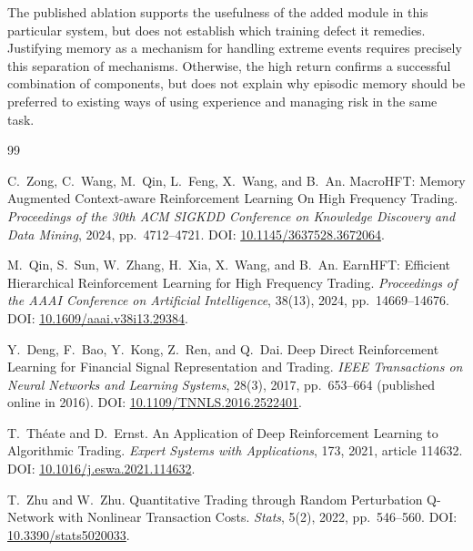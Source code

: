 \documentclass[9pt,a4paper,twocolumn]{extarticle}
\begin{document}
The published ablation supports the usefulness of the added module in this particular system,
but does not establish which training defect it remedies. Justifying memory as a mechanism for
handling extreme events requires precisely this separation of mechanisms. Otherwise, the high
return confirms a successful combination of components, but does not explain why episodic memory
should be preferred to existing ways of using experience and managing risk in the same task.


\begin{thebibliography}{99}
  \setlength{\itemsep}{0.55ex}

  C.~Zong, C.~Wang, M.~Qin, L.~Feng,
  X.~Wang, and B.~An.
  \newblock
  MacroHFT: Memory Augmented Context-aware
  Reinforcement Learning On High Frequency Trading.
  \newblock
  \emph{Proceedings of the 30th ACM SIGKDD
  Conference on Knowledge Discovery and Data Mining},
  2024, pp.~4712--4721.
  \newblock
  DOI:
  \href{https://doi.org/10.1145/3637528.3672064}
  {10.1145/3637528.3672064}.

  M.~Qin, S.~Sun, W.~Zhang, H.~Xia,
  X.~Wang, and B.~An.
  \newblock
  EarnHFT: Efficient Hierarchical Reinforcement
  Learning for High Frequency Trading.
  \newblock
  \emph{Proceedings of the AAAI Conference
  on Artificial Intelligence},
  38(13), 2024, pp.~14669--14676.
  \newblock
  DOI:
  \href{https://doi.org/10.1609/aaai.v38i13.29384}
  {10.1609/aaai.v38i13.29384}.

  Y.~Deng, F.~Bao, Y.~Kong, Z.~Ren,
  and Q.~Dai.
  \newblock
  Deep Direct Reinforcement Learning for
  Financial Signal Representation and Trading.
  \newblock
  \emph{IEEE Transactions on Neural Networks
  and Learning Systems},
  28(3), 2017, pp.~653--664
  (published online in 2016).
  \newblock
  DOI:
  \href{https://doi.org/10.1109/TNNLS.2016.2522401}
  {10.1109/TNNLS.2016.2522401}.

  T.~Th\'eate and D.~Ernst.
  \newblock
  An Application of Deep Reinforcement
  Learning to Algorithmic Trading.
  \newblock
  \emph{Expert Systems with Applications},
  173, 2021, article 114632.
  \newblock
  DOI:
  \href{https://doi.org/10.1016/j.eswa.2021.114632}
  {10.1016/j.eswa.2021.114632}.

  T.~Zhu and W.~Zhu.
  \newblock
  Quantitative Trading through Random
  Perturbation Q-Network with Nonlinear
  Transaction Costs.
  \newblock
  \emph{Stats},
  5(2), 2022, pp.~546--560.
  \newblock
  DOI:
  \href{https://doi.org/10.3390/stats5020033}
  {10.3390/stats5020033}.


\end{thebibliography}
\end{document}
